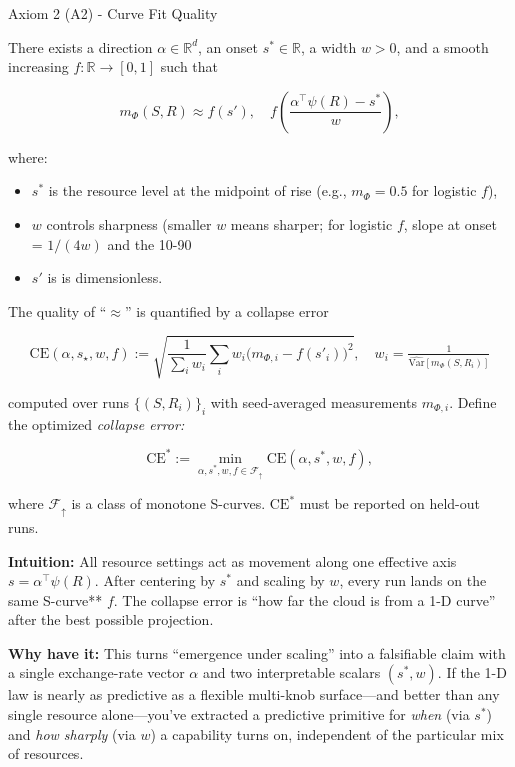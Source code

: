 \documentclass[12pt]{article}
\begin{document}
\begin{statementbox}{Axiom 2 (A2) - Curve Fit Quality}

There exists a direction $\alpha\in \mathbb R^d$, an onset $s^*\in \mathbb R$, a width $w>0$, and a smooth increasing $f:\mathbb R\to [0,1]$ such that
    
\[
m_\Phi(S,R)\approx f(s'),\quad f\left ( \frac{\alpha^\top \psi (R)-s^*}{w}\right),
\]

where:

\begin{itemize}
    \item $s^*$ is the resource level at the midpoint of rise (e.g., $m_\Phi=0.5$ for logistic $f$),
    \item $w$ controls sharpness (smaller $w$ means sharper; for logistic $f$, slope at onset = $1/(4w)$ and the 10-90%
    \item $s'$ is is dimensionless.
\end{itemize}

The quality of “$\approx$” is quantified by a collapse error

\[
\mathrm{CE}(\alpha, s_\star, w, f)
:=\sqrt{\frac{1}{\sum_i w_i}\sum_i w_i\big(m_{\Phi,i}-f(s'_i)\big)^2},\quad
w_i=\tfrac{1}{\widehat{\mathrm{Var}}[m_{\Phi}(S,R_i)]}  
\]

computed over runs $\{(S,R_i)\}_i$ with seed-averaged measurements $m_{\Phi, i}$. Define the optimized \textit{collapse error:}

\[
\mathrm{CE}^*:= \min_{\alpha, s^*,w,f\in \mathcal F_\uparrow} \mathrm{CE}(\alpha,s^*,w,f),
\]

where $\mathcal F_\uparrow$ is a class of monotone S-curves. $\mathrm {CE}^*$ must be reported on held-out runs.

\end{statementbox}


\textbf{Intuition:} All resource settings act as movement along one effective axis $s=\alpha^\top\psi(R)$. After centering by $s^*$ and scaling by $w$, every run lands on the same S-curve** $f$. The collapse error is “how far the cloud is from a 1-D curve” after the best possible projection.

\textbf{Why have it:} This turns “emergence under scaling” into a falsifiable claim with a single exchange-rate vector $\alpha$ and two interpretable scalars $(s^*,w)$. If the 1-D law is nearly as predictive as a flexible multi-knob surface—and better than any single resource alone—you’ve extracted a predictive primitive for \textit{when} (via $s^*$) and \textit{how sharply} (via $w$) a capability turns on, independent of the particular mix of resources.
\end{document}

